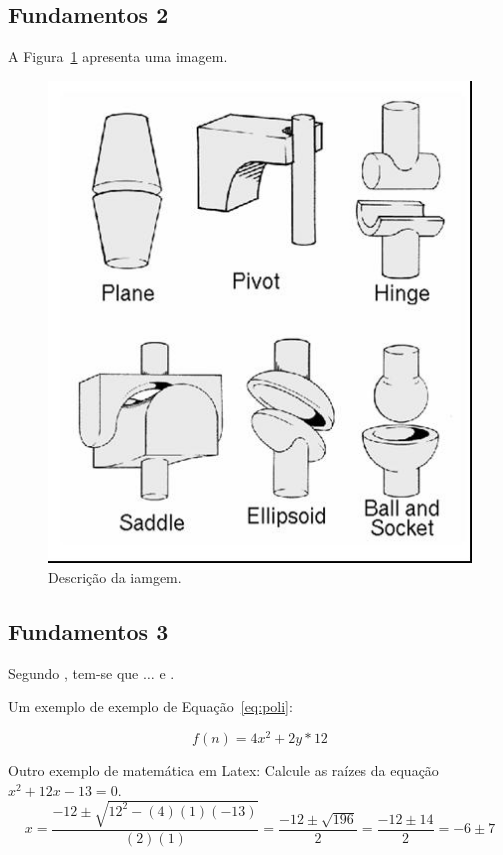 \subsection{Fundamentos 2}
\label{sec:fundamentos2}


A Figura~\ref{fig_grafico} apresenta uma imagem.

\begin{figure}[h!]    
	\begin{center}
	    \includegraphics[scale=0.5]{imagens/fig2.jpg}
	\end{center}
    \caption{\label{fig_grafico}Descrição da iamgem.}
\end{figure}

\subsection{Fundamentos 3}
\label{sec:fundamentos3}


Segundo , tem-se que $\dots$ \cite{boulic:91} e \cite{smith:99}.


Um exemplo de exemplo de Equação~\ref{eq:poli}:

\begin{equation}
\label{eq:poli}
    f(n) = 4x^2 + 2y*12
\end{equation}

Outro exemplo de matemática em Latex: Calcule as raízes da equação $x^2 + 12x - 13 = 0$.
\begin{equation}
 x = \frac{-12 \pm \sqrt{12^2 - (4)(1)(-13)}}{(2)(1)} = \frac{-12 \pm \sqrt{196}}{2} = \frac{-12 \pm 14}{2} = -6 \pm 7
\end{equation}
